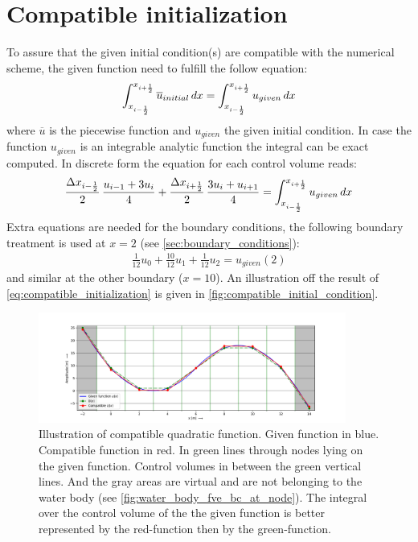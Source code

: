 \section{Compatible initialization}\label{sec:compatible_initialization}
To assure that the given initial condition(s) are compatible with the numerical scheme, the given function need to fulfill the follow equation:
\begin{align}
    \int_{x_{i-\frac{1}{2}}}^{x_{i+\frac{1}{2}}} \overline u_{initial}\, dx = \int_{x_{i-\frac{1}{2}}}^{x_{i+\frac{1}{2}}} u_{given}\, dx \label{eq:compatible_initialization}
\end{align}
where $\overline{u}$ is the piecewise function and $u_{given}$ the given initial condition.
In case the function $u_{given}$ is an integrable analytic function the integral can be exact computed.
In discrete form the equation for each control volume reads:
\begin{align}
    \frac{\Delta x_{i-\frac{1}{2}}}{2}\,\frac{u_{i-1} + 3 u_i}{4} +
    \frac{\Delta x_{i+\frac{1}{2}}}{2}\,\frac{3 u_i + u_{i+1}}{4} = \int_{x_{i-\frac{1}{2}}}^{x_{i+\frac{1}{2}}} u_{given}\, dx
\end{align}
Extra equations are needed for the boundary conditions, the following boundary treatment is used at $x=2$ (see  \autoref{sec:boundary_conditions}):
\begin{align}
    \frac{1}{12} u_0 + \frac{10}{12}u_1 + \frac{1}{12} u_2 = u_{given}(2)
\end{align}
and similar at the other boundary ($x=10$).
An illustration off the result of \autoref{eq:compatible_initialization} is given in \autoref{fig:compatible_initial_condition}.
\begin{figure}[H]
    \centering
    \includegraphics[width=0.9\textwidth]{figures/compatible_initialization_lx=12.0_dx=2.0.pdf}
    \caption[Illustration of compatible quadratic function]{Illustration of compatible quadratic function. Given function in blue. Compatible function in red. In green lines through nodes lying on the given function. Control volumes in between the green vertical lines. And the gray areas are virtual and are not belonging to the water body (see \autoref{fig:water_body_fve_bc_at_node}). The integral over the control volume of the the given function is better represented by the red-function then by the green-function. }\label{fig:compatible_initial_condition}
\end{figure}
